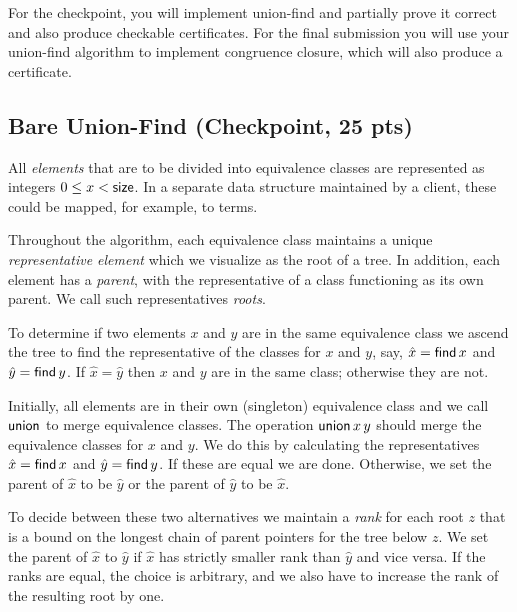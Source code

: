 \documentclass[11pt]{article}
\begin{document}
For the checkpoint, you will implement union-find and partially
prove it correct and also produce checkable certificates.
For the final submission you will use your union-find algorithm
to implement congruence closure, which will also produce a
certificate.

\subsection{Bare Union-Find (Checkpoint, 25 pts)}

All \emph{elements} that are to be divided into equivalence classes
are represented as integers $0 \leq x < \mathsf{size}$.  In a separate data
structure maintained by a client, these could be mapped, for example,
to terms.

Throughout the algorithm, each equivalence class maintains a unique
\emph{representative element} which we visualize as the root of a
tree.  In addition, each element has a \emph{parent}, with the
representative of a class functioning as its own parent.  We call such
representatives \emph{roots}.

To determine if two elements $x$ and $y$ are in the same equivalence
class we ascend the tree to find the representative of the classes for
$x$ and $y$, say, $\hat{x} = \mathsf{find}\, x$ and
$\hat{y} = \mathsf{find}\, y$.  If $\hat{x} = \hat{y}$ then $x$ and $y$ are
in the same class; otherwise they are not.

Initially, all elements are in their own (singleton) equivalence
class and we call $\mathsf{union}$ to merge equivalence classes.
The operation $\mathsf{union}\, x\, y$ should merge the equivalence classes
for $x$ and $y$.  We do this by calculating the representatives
$\hat{x} = \mathsf{find}\, x$ and $\hat{y} = \mathsf{find}\, y$.  If these are
equal we are done.  Otherwise, we set the parent of $\hat{x}$ to be
$\hat{y}$ or the parent of $\hat{y}$ to be $\hat{x}$.

To decide between these two alternatives we maintain a \emph{rank} for
each root $z$ that is a bound on the longest chain of parent pointers
for the tree below $z$.  We set the parent of $\hat{x}$ to $\hat{y}$
if $\hat{x}$ has strictly smaller rank than $\hat{y}$ and vice versa.
If the ranks are equal, the choice is arbitrary, and we also have to
increase the rank of the resulting root by one.
\end{document}
